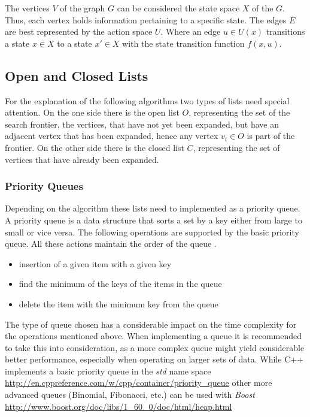 The vertices $V$ of the graph $G$ can be considered the state space $X$ of the $G$. Thus, each vertex holds information pertaining to a specific state. The edges $E$ are best represented by the action space $U$. Where an edge $u \in U(x)$ transitions a state $x \in X$ to a state $x' \in X$ with the state transition function $f(x,u)$.

\subsection{Open and Closed Lists}
For the explanation of the following algorithms two types of lists need special attention. On the one side there is the open list $O$, representing the set of the search frontier, the vertices, that have not yet been expanded, but have an adjacent vertex that has been expanded, hence any vertex $v_i \in O$ is part of the frontier. On the other side there is the closed list $C$, representing the set of vertices that have already been expanded.

\subsubsection{Priority Queues}
Depending on the algorithm these lists need to implemented as a priority queue. A priority queue is a data structure that sorts a set by a key either from large to small or vice versa. The following operations are supported by the basic priority queue. All these actions maintain the order of the queue \cite{Skiena.2008}.

\begin{itemize}
    \item insertion of a given item with a given key
    \item find the minimum of the keys of the items in the queue
    \item delete the item with the minimum key from the queue
\end{itemize}

The type of queue chosen has a considerable impact on the time complexity for the operations mentioned above. When implementing a queue it is recommended to take this into consideration, as a more complex queue might yield considerable better performance, especially when operating on larger sets of data. While C++ implements a basic priority queue in the \emph{std} name space \url{http://en.cppreference.com/w/cpp/container/priority_queue} other more advanced queues (Binomial, Fibonacci, etc.) can be used with \emph{Boost} \url{http://www.boost.org/doc/libs/1_60_0/doc/html/heap.html}

